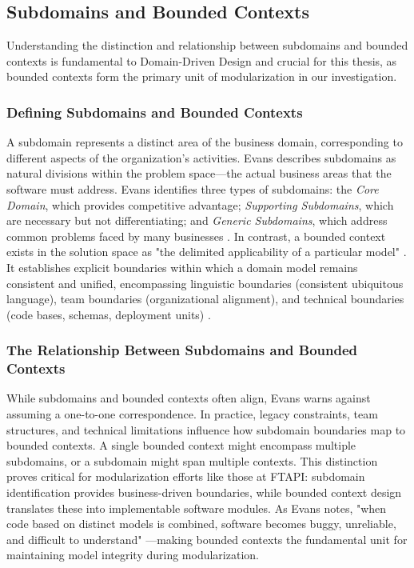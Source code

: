 \subsection{Subdomains and Bounded Contexts}
Understanding the distinction and relationship between subdomains and bounded contexts is fundamental to Domain-Driven Design and crucial for this thesis, as bounded contexts form the primary unit of modularization in our investigation.

\subsubsection{Defining Subdomains and Bounded Contexts}
A subdomain represents a distinct area of the business domain, corresponding to different aspects of the organization's activities. Evans \autocite[]{Evans2003} describes subdomains as natural divisions within the problem space—the actual business areas that the software must address. Evans identifies three types of subdomains: the \textit{Core Domain}, which provides competitive advantage; \textit{Supporting Subdomains}, which are necessary but not differentiating; and \textit{Generic Subdomains}, which address common problems faced by many businesses \autocite[]{Evans2003}.
In contrast, a bounded context exists in the solution space as "the delimited applicability of a particular model" \autocite[]{Evans2003}. It establishes explicit boundaries within which a domain model remains consistent and unified, encompassing linguistic boundaries (consistent ubiquitous language), team boundaries (organizational alignment), and technical boundaries (code bases, schemas, deployment units) \autocite[]{Evans2003}.
\subsubsection{The Relationship Between Subdomains and Bounded Contexts}
While subdomains and bounded contexts often align, Evans \autocite[]{Evans2003} warns against assuming a one-to-one correspondence. In practice, legacy constraints, team structures, and technical limitations influence how subdomain boundaries map to bounded contexts. A single bounded context might encompass multiple subdomains, or a subdomain might span multiple contexts.
This distinction proves critical for modularization efforts like those at FTAPI: subdomain identification provides business-driven boundaries, while bounded context design translates these into implementable software modules. As Evans notes, "when code based on distinct models is combined, software becomes buggy, unreliable, and difficult to understand" \autocite[p.~271]{Evans2003}—making bounded contexts the fundamental unit for maintaining model integrity during modularization.


